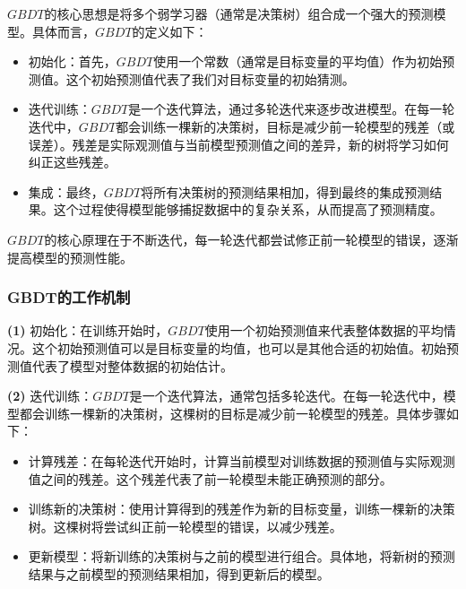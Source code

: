 \documentclass[withoutpreface,bwprint]{cumcmthesis}
\begin{document}
\(GBDT\)的核心思想是将多个弱学习器（通常是决策树）组合成一个强大的预测模型。具体而言，\(GBDT\)的定义如下：

\begin{itemize}[itemindent=2em]

\item 初始化：首先，\(GBDT\)使用一个常数（通常是目标变量的平均值）作为初始预测值。这个初始预测值代表了我们对目标变量的初始猜测。

\item 迭代训练：\(GBDT\)是一个迭代算法，通过多轮迭代来逐步改进模型。在每一轮迭代中，\(GBDT\)都会训练一棵新的决策树，目标是减少前一轮模型的残差（或误差）。残差是实际观测值与当前模型预测值之间的差异，新的树将学习如何纠正这些残差。

\item 集成：最终，\(GBDT\)将所有决策树的预测结果相加，得到最终的集成预测结果。这个过程使得模型能够捕捉数据中的复杂关系，从而提高了预测精度。

\end{itemize}

\(GBDT\)的核心原理在于不断迭代，每一轮迭代都尝试修正前一轮模型的错误，逐渐提高模型的预测性能。

\subsubsection{GBDT的工作机制}

\textbf{(1)} 初始化：在训练开始时，\(GBDT\)使用一个初始预测值来代表整体数据的平均情况。这个初始预测值可以是目标变量的均值，也可以是其他合适的初始值。初始预测值代表了模型对整体数据的初始估计。

\textbf{(2)} 迭代训练：\(GBDT\)是一个迭代算法，通常包括多轮迭代。在每一轮迭代中，模型都会训练一棵新的决策树，这棵树的目标是减少前一轮模型的残差。具体步骤如下：

\begin{itemize}

    \item 计算残差：在每轮迭代开始时，计算当前模型对训练数据的预测值与实际观测值之间的残差。这个残差代表了前一轮模型未能正确预测的部分。

    \item 训练新的决策树：使用计算得到的残差作为新的目标变量，训练一棵新的决策树。这棵树将尝试纠正前一轮模型的错误，以减少残差。

    \item 更新模型：将新训练的决策树与之前的模型进行组合。具体地，将新树的预测结果与之前模型的预测结果相加，得到更新后的模型。
    
\end{itemize}
\end{document}
